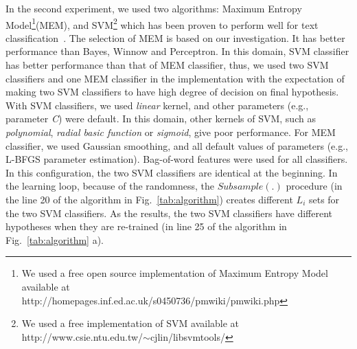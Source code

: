 \documentclass[english]{jnlp_1.4}
\begin{document}
In the second experiment, we used two algorithms: Maximum Entropy
Model\footnote{We used a free open source
implementation of Maximum Entropy Model available at \\
http://homepages.inf.ed.ac.uk/s0450736/pmwiki/pmwiki.php}(MEM),
and SVM\footnote{We used a free implementation of SVM available at
http://www.csie.ntu.edu.tw/$\sim$cjlin/libsvmtools/} which has
been proven to perform well for text
classification~\cite{Thorsten1998}. The selection of MEM is based
on our investigation. It has better performance than Bayes, Winnow
and Perceptron. In this domain, SVM classifier has better
performance than that of MEM classifier, thus, we used two SVM
classifiers and one MEM classifier in the implementation with the
expectation of making two SVM classifiers to have high degree of
decision on final hypothesis. With SVM classifiers, we used
\emph{linear} kernel, and other parameters (e.g., parameter
\textit{C}) were default. In this domain, other kernels of SVM,
such as \emph{polynomial}, \emph{radial basic function} or
\emph{sigmoid}, give poor performance. For MEM classifier, we used
Gaussian smoothing, and all default values of parameters (e.g.,
L-BFGS parameter estimation). Bag-of-word features were used for
all classifiers. In this configuration, the two SVM classifiers
are identical at the beginning. In the learning loop, because of
the randomness, the $Subsample(.)$ procedure (in the line 20 of
the algorithm in Fig.~\ref{tab:algorithm}) creates different
$L_{i}$ sets for the two SVM classifiers. As the results, the two
SVM classifiers have different hypotheses when they are re-trained
(in line 25 of the algorithm in Fig.~\ref{tab:algorithm} a).
\end{document}
